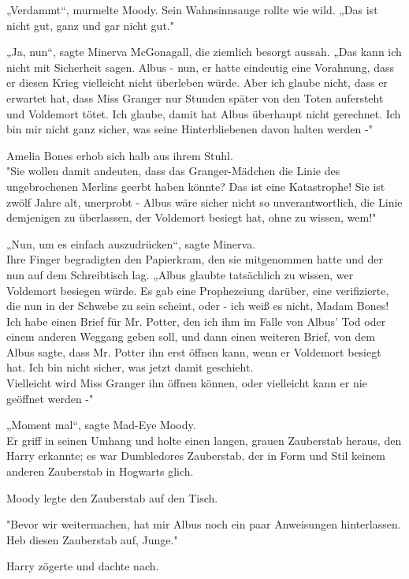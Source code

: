 {„Verdammt“, murmelte Moody. Sein Wahnsinnsauge rollte wie wild. „Das ist nicht gut, ganz und gar nicht gut."

„Ja, nun“, sagte Minerva McGonagall, die ziemlich besorgt aussah. „Das kann ich nicht mit Sicherheit sagen. Albus - nun, er hatte eindeutig eine Vorahnung, dass er diesen Krieg vielleicht nicht überleben würde. Aber ich glaube nicht, dass er erwartet hat, dass Miss Granger nur Stunden später von den Toten aufersteht und Voldemort tötet. Ich glaube, damit hat Albus überhaupt nicht gerechnet. Ich bin mir nicht ganz sicher, was seine Hinterbliebenen davon halten werden -"

Amelia Bones erhob sich halb aus ihrem Stuhl.\\ "Sie wollen damit andeuten, dass das Granger-Mädchen die Linie des ungebrochenen Merlins geerbt haben könnte? Das ist eine Katastrophe! Sie ist zwölf Jahre alt, unerprobt - Albus wäre sicher nicht so unverantwortlich, die Linie demjenigen zu überlassen, der Voldemort besiegt hat, ohne zu wissen, wem!"

„Nun, um es einfach auszudrücken“, sagte Minerva.\\ Ihre Finger begradigten den Papierkram, den sie mitgenommen hatte und der nun auf dem Schreibtisch lag. „Albus glaubte tatsächlich zu wissen, wer Voldemort besiegen würde. Es gab eine Prophezeiung darüber, eine verifizierte, die nun in der Schwebe zu sein scheint, oder - ich weiß es nicht, Madam Bones! Ich habe einen Brief für Mr. Potter, den ich ihm im Falle von Albus' Tod oder einem anderen Weggang geben soll, und dann einen weiteren Brief, von dem Albus sagte, dass Mr. Potter ihn erst öffnen kann, wenn er Voldemort besiegt hat. Ich bin nicht sicher, was jetzt damit geschieht.\\ Vielleicht wird Miss Granger ihn öffnen können, oder vielleicht kann er nie geöffnet werden -"

„Moment mal“, sagte Mad-Eye Moody.\\ Er griff in seinen Umhang und holte einen langen, grauen Zauberstab heraus, den Harry erkannte; es war Dumbledores Zauberstab, der in Form und Stil keinem anderen Zauberstab in Hogwarts glich.

Moody legte den Zauberstab auf den Tisch.

"Bevor wir weitermachen, hat mir Albus noch ein paar Anweisungen hinterlassen.\\ Heb diesen Zauberstab auf, Junge."

Harry zögerte und dachte nach.

}
